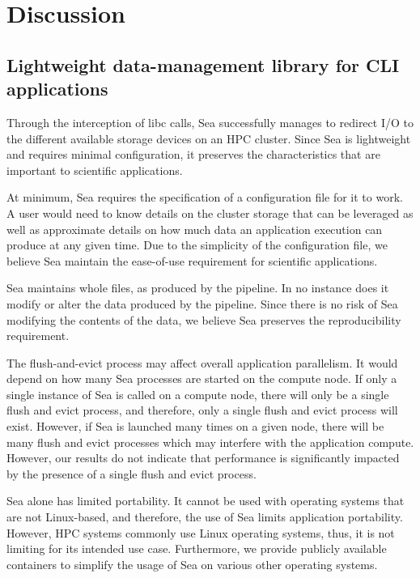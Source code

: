 \section{Discussion}

    \subsection{Lightweight data-management library for CLI applications}

    Through the interception of libc calls, Sea successfully manages to redirect
    I/O to the different available storage devices on an HPC cluster.
    Since Sea is lightweight and requires minimal configuration, it preserves
    the characteristics that are important to scientific applications.

    At minimum, Sea requires the specification of a configuration file for it to work.
    A user would need to know details on the cluster storage that can be leveraged as 
    well as approximate details on how much data an application execution can produce 
    at any given time. Due to the simplicity of the configuration file, we believe
    Sea maintain the ease-of-use requirement for scientific applications.

    Sea maintains whole files, as produced by the pipeline. In no instance does it modify
    or alter the data produced by the pipeline. Since there is no risk of Sea modifying
    the contents of the data, we believe Sea preserves the reproducibility requirement.

    The flush-and-evict process may affect overall application parallelism. It
    would depend on how many Sea processes are started on the compute node. If
    only a single instance of Sea is called on a compute node, there will only
    be a single flush and evict process, and therefore, only a single flush and
    evict process will exist. However, if Sea is launched many times on a given
    node, there will be many flush and evict processes which may interfere with
    the application compute. However, our results do not indicate that
    performance is significantly impacted by the presence of a single flush and
    evict process.  

    Sea alone has limited portability. It cannot be used with operating systems that are
    not Linux-based, and therefore, the use of Sea limits application portability.
    However, HPC systems commonly use Linux operating systems, thus, it is not limiting
    for its intended use case. Furthermore, we provide publicly available containers to
    simplify the usage of Sea on various other operating systems.

